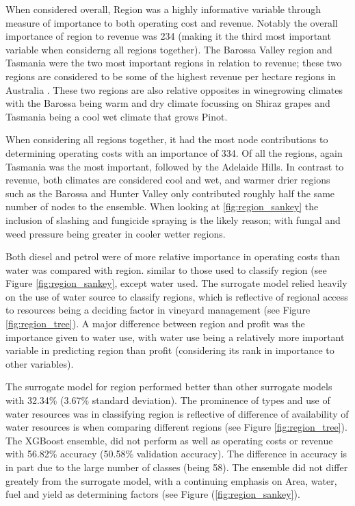 \documentclass[review,12pt,authoryear]{elsarticle}
\begin{document}
\begin{linenumbers}
When considered overall, Region was a highly informative variable through measure of importance to both operating cost and revenue. Notably the overall importance of region to revenue was 234 (making it the third most important variable when considerng all regions together). The Barossa Valley region and Tasmania were the two most important regions in relation to revenue; these two regions are considered to be some of the highest revenue per hectare regions in Australia \citep{wineaustraliaNationalVintageReport2022}. These two regions are also relative opposites in winegrowing climates with the Barossa being warm and dry climate focussing on Shiraz grapes and Tasmania being a cool wet climate that grows Pinot. 
\par
When considering all regions together, it had the most node contributions to determining operating costs with an importance of 334. Of all the regions, again Tasmania was the most important, followed by the Adelaide Hills. In contrast to revenue, both climates are considered cool and wet, and warmer drier regions such as the Barossa and Hunter Valley only contributed roughly half the same number of nodes to the ensemble. When looking at \ref{fig:region_sankey} the inclusion of slashing and fungicide spraying is the likely reason; with fungal and weed pressure being greater in cooler wetter regions.
\par
Both diesel and petrol were of more relative importance in operating costs than water was compared with region. similar to those used to classify region (see Figure \ref{fig:region_sankey}, except water used. The surrogate model relied heavily on the use of water source to classify regions, which is reflective of regional access to resources being a deciding factor in vineyard management (see Figure \ref{fig:region_tree}). A major difference between region and profit was the importance given to water use, with water use being a relatively more important variable in predicting region than profit (considering its rank in importance to other variables). 
\par
The surrogate model for region performed better than other surrogate models with 32.34\% (3.67\% standard deviation). The prominence of types and use of water resources was in classifying region is reflective of difference of availability of water resources is when comparing different regions (see Figure \ref{fig:region_tree}). The XGBoost ensemble, did not perform as well as operating costs or revenue with 56.82\% accuracy (50.58\% validation accuracy). The difference in accuracy is in part due to the large number of classes (being 58). The ensemble did not differ greately from the surrogate model, with a continuing emphasis on Area, water, fuel and yield as determining factors (see Figure (\ref{fig:region_sankey}). 

\end{linenumbers}
\end{document}
